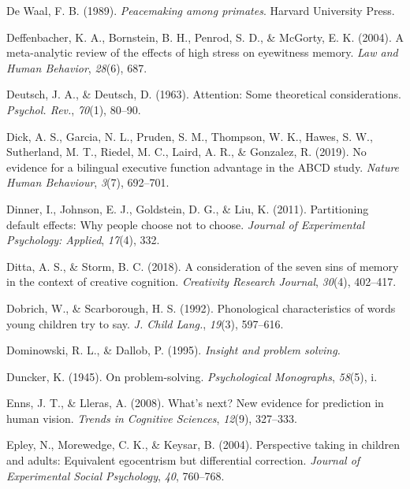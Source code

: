 \documentclass[
]{krantz}
\newlength{\cslhangindent}
\newenvironment{CSLReferences}[2] %
 {\begin{list}{}{%
  \setlength{\itemindent}{0pt}
  \setlength{\leftmargin}{0pt}
  \setlength{\parsep}{0pt}
  \ifodd #1
   \setlength{\leftmargin}{\cslhangindent}
   \setlength{\itemindent}{-1\cslhangindent}
  \fi
  \setlength{\itemsep}{#2\baselineskip}}}
 {\end{list}}
\begin{document}
\begin{CSLReferences}{1}{0}
De Waal, F. B. (1989). \emph{Peacemaking among primates}. Harvard University Press.

Deffenbacher, K. A., Bornstein, B. H., Penrod, S. D., \& McGorty, E. K. (2004). A meta-analytic review of the effects of high stress on eyewitness memory. \emph{Law and Human Behavior}, \emph{28}(6), 687.

Deutsch, J. A., \& Deutsch, D. (1963). Attention: Some theoretical considerations. \emph{Psychol. Rev.}, \emph{70}(1), 80--90.

Dick, A. S., Garcia, N. L., Pruden, S. M., Thompson, W. K., Hawes, S. W., Sutherland, M. T., Riedel, M. C., Laird, A. R., \& Gonzalez, R. (2019). No evidence for a bilingual executive function advantage in the ABCD study. \emph{Nature Human Behaviour}, \emph{3}(7), 692--701.

Dinner, I., Johnson, E. J., Goldstein, D. G., \& Liu, K. (2011). Partitioning default effects: Why people choose not to choose. \emph{Journal of Experimental Psychology: Applied}, \emph{17}(4), 332.

Ditta, A. S., \& Storm, B. C. (2018). A consideration of the seven sins of memory in the context of creative cognition. \emph{Creativity Research Journal}, \emph{30}(4), 402--417.

Dobrich, W., \& Scarborough, H. S. (1992). Phonological characteristics of words young children try to say. \emph{J. Child Lang.}, \emph{19}(3), 597--616.

Dominowski, R. L., \& Dallob, P. (1995). \emph{Insight and problem solving.}

Duncker, K. (1945). On problem-solving. \emph{Psychological Monographs}, \emph{58}(5), i.

Enns, J. T., \& Lleras, A. (2008). What's next? New evidence for prediction in human vision. \emph{Trends in Cognitive Sciences}, \emph{12}(9), 327--333.

Epley, N., Morewedge, C. K., \& Keysar, B. (2004). Perspective taking in children and adults: Equivalent egocentrism but differential correction. \emph{Journal of Experimental Social Psychology}, \emph{40}, 760--768.


\end{CSLReferences}
\end{document}
